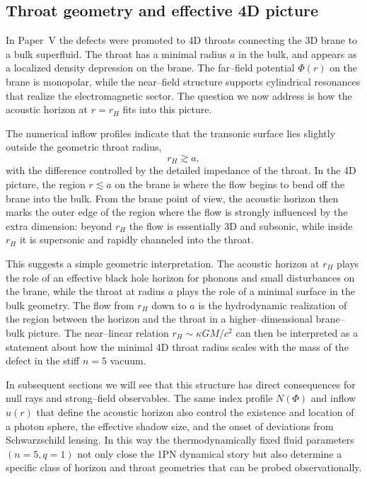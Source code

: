 \documentclass[11pt]{article}
\begin{document}
\subsection{Throat geometry and effective 4D picture}
\label{subsec:acoustic-throat-geometry}

In Paper~V the defects were promoted to 4D throats connecting the 3D brane
to a bulk superfluid.  The throat has a minimal radius \(a\) in the bulk,
and appears as a localized density depression on the brane.  The far–field
potential \(\Phi(r)\) on the brane is monopolar, while the near–field
structure supports cylindrical resonances that realize the electromagnetic
sector.  The question we now address is how the acoustic horizon at
\(r = r_H\) fits into this picture.

The numerical inflow profiles indicate that the transonic surface lies
slightly outside the geometric throat radius,
\begin{equation}
  r_H \gtrsim a,
  \label{eq:rH-a-relationship}
\end{equation}
with the difference controlled by the detailed impedance of the throat.  In
the 4D picture, the region \(r \lesssim a\) on the brane is where the flow
begins to bend off the brane into the bulk.  From the brane point of view,
the acoustic horizon then marks the outer edge of the region where the flow
is strongly influenced by the extra dimension: beyond \(r_H\) the flow is
essentially 3D and subsonic, while inside \(r_H\) it is supersonic and
rapidly channeled into the throat.

This suggests a simple geometric interpretation.  The acoustic horizon at
\(r_H\) plays the role of an effective black hole horizon for phonons and
small disturbances on the brane, while the throat at radius \(a\) plays the
role of a minimal surface in the bulk geometry.  The flow from \(r_H\) down
to \(a\) is the hydrodynamic realization of the region between the horizon
and the throat in a higher–dimensional brane–bulk picture.  The near–linear
relation \(r_H \sim \kappa G M / c^2\) can then be interpreted as a
statement about how the minimal 4D throat radius scales with the mass of the
defect in the stiff \(n=5\) vacuum.

In subsequent sections we will see that this structure has direct
consequences for null rays and strong–field observables.  The same index
profile \(N(\Phi)\) and inflow \(u(r)\) that define the acoustic horizon
also control the existence and location of a photon sphere, the effective
shadow size, and the onset of deviations from Schwarzschild lensing.  In
this way the thermodynamically fixed fluid parameters \((n=5, q=1)\) not
only close the 1PN dynamical story but also determine a specific class of
horizon and throat geometries that can be probed observationally.
\end{document}

